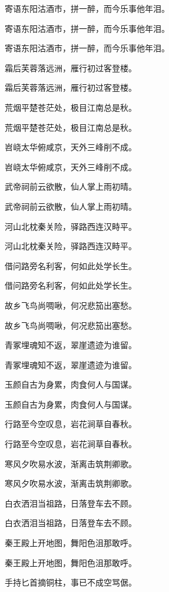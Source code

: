 \documentclass[12pt, a4paper, addpoints]{exam}
\begin{document}
\begin{questions}
\question[3] 寄语东阳沽酒市，拼一醉，而今乐事他年泪。

\question[3] 寄语东阳沽酒市，拼一醉，而今乐事他年泪。

\question[3] 寄语东阳沽酒市，拼一醉，而今乐事他年泪。

\question[3] 霜后芙蓉落远洲，雁行初过客登楼。

\question[3] 霜后芙蓉落远洲，雁行初过客登楼。

\question[3] 荒烟平楚苍茫处，极目江南总是秋。

\question[3] 荒烟平楚苍茫处，极目江南总是秋。

\question[3] 岧峣太华俯咸京，天外三峰削不成。

\question[3] 岧峣太华俯咸京，天外三峰削不成。

\question[3] 武帝祠前云欲散，仙人掌上雨初晴。

\question[3] 武帝祠前云欲散，仙人掌上雨初晴。

\question[3] 河山北枕秦关险，驿路西连汉畤平。

\question[3] 河山北枕秦关险，驿路西连汉畤平。

\question[3] 借问路旁名利客，何如此处学长生。

\question[3] 借问路旁名利客，何如此处学长生。

\question[3] 故乡飞鸟尚啁啾，何况悲笳出塞愁。

\question[3] 故乡飞鸟尚啁啾，何况悲笳出塞愁。

\question[3] 青冢埋魂知不返，翠崖遗迹为谁留。

\question[3] 青冢埋魂知不返，翠崖遗迹为谁留。

\question[3] 玉颜自古为身累，肉食何人与国谋。

\question[3] 玉颜自古为身累，肉食何人与国谋。

\question[3] 行路至今空叹息，岩花涧草自春秋。

\question[3] 行路至今空叹息，岩花涧草自春秋。

\question[3] 寒风夕吹易水波，渐离击筑荆卿歌。

\question[3] 寒风夕吹易水波，渐离击筑荆卿歌。

\question[3] 白衣洒泪当祖路，日落登车去不顾。

\question[3] 白衣洒泪当祖路，日落登车去不顾。

\question[3] 秦王殿上开地图，舞阳色沮那敢呼。

\question[3] 秦王殿上开地图，舞阳色沮那敢呼。

\question[3] 手持匕首摘铜柱，事已不成空骂倨。


\end{questions}
\end{document}
